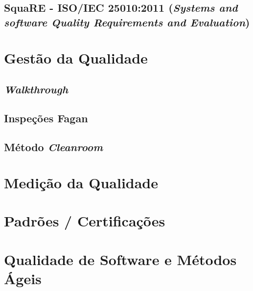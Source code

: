 \documentclass[
	12pt,				%
	openright,			%
	twoside,			%
	a4paper,			%
	english,			%
	brazil,				%
	]{abntex2}
\begin{document}
\subsection{SquaRE - ISO/IEC 25010:2011 (\emph{Systems and software Quality Requirements
and Evaluation})}

\section{Gestão da Qualidade}


\subsection{\emph{Walkthrough}}


\subsection{Inspeções Fagan}


\subsection{Método \emph{Cleanroom}}

\section{Medição da Qualidade}

\section{Padrões / Certificações}

\section{Qualidade de Software e Métodos Ágeis}

\end{document}
